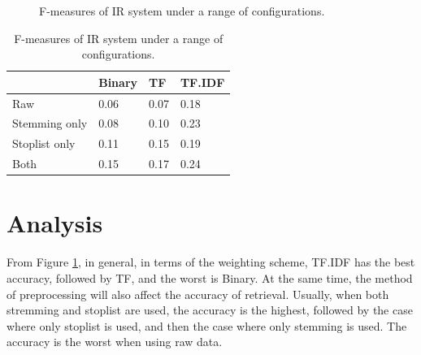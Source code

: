 \documentclass[11pt,a4paper]{article}
\begin{document}
\newpage

\begin{figure}[H]
    \centering
    \caption{F-measures of IR system under a range of configurations.}
    \label{fig:result}
\end{figure}


\begin{table}[H]
    \centering
    \begin{tabular}{|l|l|l|l|}
        \hline
        &Binary&TF&TF.IDF\\
        \hline
        Raw&0.06&0.07&0.18\\
        \hline
        Stemming only&0.08&0.10&0.23\\
        \hline
        Stoplist only&0.11&0.15&0.19\\
        \hline
        Both&0.15&0.17&0.24\\
        \hline
    \end{tabular}
    \caption{F-measures of IR system under a range of configurations.}
    \label{tab:result}
\end{table}

\section*{\Large Analysis}

From Figure \ref{fig:result}, in general, in terms of the weighting scheme, TF.IDF has the best accuracy, followed by TF, and the worst is Binary. At the same time, the method of preprocessing will also affect the accuracy of retrieval. Usually, when both stremming and stoplist are used, the accuracy is the highest, followed by the case where only stoplist is used, and then the case where only stemming is used. The accuracy is the worst when using raw data.
\end{document}
